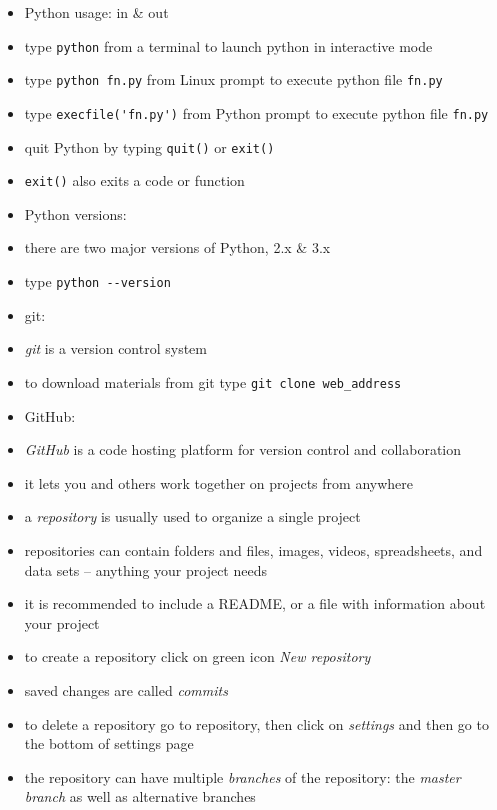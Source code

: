 \documentclass[onecolumn]{IEEEtran} %
\begin{document}
\begin{itemize}
    \item Python usage: in \& out
    \bi
        \item type \verb|python| from a terminal to launch python in interactive mode
        \item type \verb|python fn.py| from Linux prompt to execute python file \verb|fn.py|
        \item type \verb|execfile('fn.py')| from Python prompt to execute python file \verb|fn.py|
        \item quit Python by typing \verb|quit()| or \verb|exit()|
        \item \verb|exit()| also exits a code or function
    \ei
    \item Python versions:
    \bi
        \item there are two major versions of Python, 2.x \& 3.x
        \item type \verb|python --version|
    \ei
    \item git:
    \bi
        \item \emph{git} is a version control system
        \bi
            \item to download materials from git type \newline \verb|git clone web_address|
        \ei
    \ei 
    \item GitHub:
    \bi 
        \item \emph{GitHub} is a code hosting platform for version control and collaboration
        \bi 
            \item it lets you and others work together on projects from anywhere
        \ei 
        \item a \emph{repository} is usually used to organize a single project
        \bi 
            \item repositories can contain folders and files, images, videos, spreadsheets, and data sets – anything your project needs 
            \item it is recommended to include a README, or a file with information about your project 
            \item to create a repository click on green icon \emph{New repository}
            \item saved changes are called \emph{commits}
            \item to delete a repository go to repository, then click on \emph{settings} and then go to the bottom of settings page
        \ei 
        \item the repository can have multiple \emph{branches} of the repository: the \emph{master branch} as well as alternative branches

\end{itemize}
\end{document}
